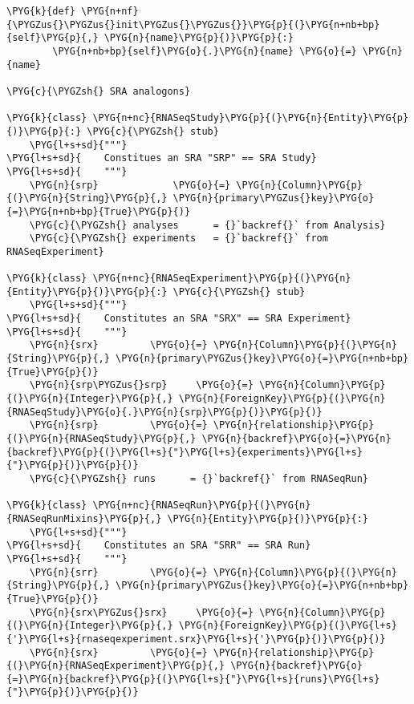 \begin{Verbatim}[commandchars=\\\{\}]
    \PYG{k}{def} \PYG{n+nf}{\PYGZus{}\PYGZus{}init\PYGZus{}\PYGZus{}}\PYG{p}{(}\PYG{n+nb+bp}{self}\PYG{p}{,} \PYG{n}{name}\PYG{p}{)}\PYG{p}{:}
        \PYG{n+nb+bp}{self}\PYG{o}{.}\PYG{n}{name} \PYG{o}{=} \PYG{n}{name}

\PYG{c}{\PYGZsh{} SRA analogons}

\PYG{k}{class} \PYG{n+nc}{RNASeqStudy}\PYG{p}{(}\PYG{n}{Entity}\PYG{p}{)}\PYG{p}{:} \PYG{c}{\PYGZsh{} stub}
    \PYG{l+s+sd}{"""}
\PYG{l+s+sd}{    Constitues an SRA "SRP" == SRA Study}
\PYG{l+s+sd}{    """}
    \PYG{n}{srp}             \PYG{o}{=} \PYG{n}{Column}\PYG{p}{(}\PYG{n}{String}\PYG{p}{,} \PYG{n}{primary\PYGZus{}key}\PYG{o}{=}\PYG{n+nb+bp}{True}\PYG{p}{)}
    \PYG{c}{\PYGZsh{} analyses      = {}`backref{}` from Analysis}
    \PYG{c}{\PYGZsh{} experiments   = {}`backref{}` from RNASeqExperiment}

\PYG{k}{class} \PYG{n+nc}{RNASeqExperiment}\PYG{p}{(}\PYG{n}{Entity}\PYG{p}{)}\PYG{p}{:} \PYG{c}{\PYGZsh{} stub}
    \PYG{l+s+sd}{"""}
\PYG{l+s+sd}{    Constitutes an SRA "SRX" == SRA Experiment}
\PYG{l+s+sd}{    """}
    \PYG{n}{srx}         \PYG{o}{=} \PYG{n}{Column}\PYG{p}{(}\PYG{n}{String}\PYG{p}{,} \PYG{n}{primary\PYGZus{}key}\PYG{o}{=}\PYG{n+nb+bp}{True}\PYG{p}{)}
    \PYG{n}{srp\PYGZus{}srp}     \PYG{o}{=} \PYG{n}{Column}\PYG{p}{(}\PYG{n}{Integer}\PYG{p}{,} \PYG{n}{ForeignKey}\PYG{p}{(}\PYG{n}{RNASeqStudy}\PYG{o}{.}\PYG{n}{srp}\PYG{p}{)}\PYG{p}{)}
    \PYG{n}{srp}         \PYG{o}{=} \PYG{n}{relationship}\PYG{p}{(}\PYG{n}{RNASeqStudy}\PYG{p}{,} \PYG{n}{backref}\PYG{o}{=}\PYG{n}{backref}\PYG{p}{(}\PYG{l+s}{"}\PYG{l+s}{experiments}\PYG{l+s}{"}\PYG{p}{)}\PYG{p}{)}
    \PYG{c}{\PYGZsh{} runs      = {}`backref{}` from RNASeqRun}

\PYG{k}{class} \PYG{n+nc}{RNASeqRun}\PYG{p}{(}\PYG{n}{RNASeqRunMixins}\PYG{p}{,} \PYG{n}{Entity}\PYG{p}{)}\PYG{p}{:}
    \PYG{l+s+sd}{"""}
\PYG{l+s+sd}{    Constitutes an SRA "SRR" == SRA Run}
\PYG{l+s+sd}{    """}
    \PYG{n}{srr}         \PYG{o}{=} \PYG{n}{Column}\PYG{p}{(}\PYG{n}{String}\PYG{p}{,} \PYG{n}{primary\PYGZus{}key}\PYG{o}{=}\PYG{n+nb+bp}{True}\PYG{p}{)}
    \PYG{n}{srx\PYGZus{}srx}     \PYG{o}{=} \PYG{n}{Column}\PYG{p}{(}\PYG{n}{Integer}\PYG{p}{,} \PYG{n}{ForeignKey}\PYG{p}{(}\PYG{l+s}{'}\PYG{l+s}{rnaseqexperiment.srx}\PYG{l+s}{'}\PYG{p}{)}\PYG{p}{)}
    \PYG{n}{srx}         \PYG{o}{=} \PYG{n}{relationship}\PYG{p}{(}\PYG{n}{RNASeqExperiment}\PYG{p}{,} \PYG{n}{backref}\PYG{o}{=}\PYG{n}{backref}\PYG{p}{(}\PYG{l+s}{"}\PYG{l+s}{runs}\PYG{l+s}{"}\PYG{p}{)}\PYG{p}{)}


\end{Verbatim}
